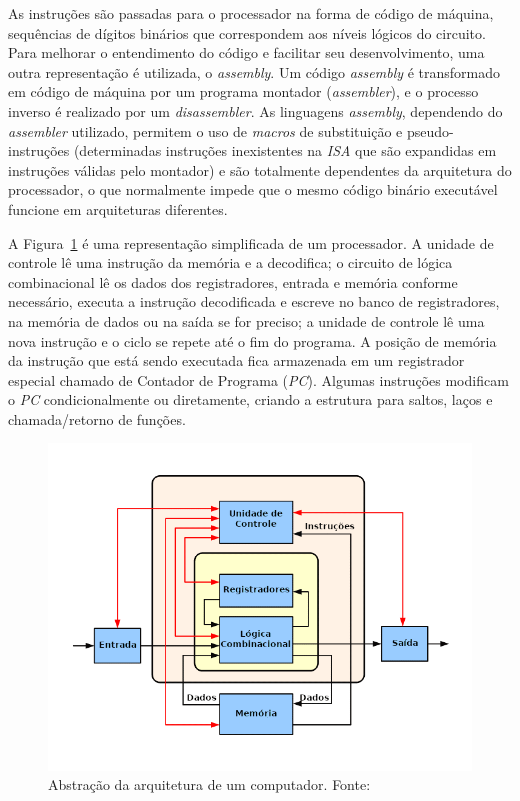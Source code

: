 { As instruções são passadas para o processador na forma de código de máquina,
    sequências de dígitos binários que correspondem aos níveis lógicos do
    circuito. Para melhorar o entendimento do código e facilitar seu
    desenvolvimento, uma outra representação é utilizada, o \textit{assembly}.
    Um código \textit{assembly} é transformado em código de máquina por um
    programa montador (\textit{assembler}), e o processo inverso é realizado
    por um \textit{disassembler}. As linguagens \textit{assembly}, dependendo do
    \textit{assembler} utilizado, permitem o uso de \textit{macros} de substituição
    e pseudo-instruções (determinadas instruções inexistentes na \textit{ISA}
    que são expandidas em instruções válidas pelo montador) e são totalmente
    dependentes da arquitetura do processador, o que normalmente impede que o
    mesmo código binário executável funcione em arquiteturas diferentes.
}

{ A Figura~\ref{fig:cpu_abstraction} é uma representação simplificada de um
    processador. A unidade de controle lê uma instrução da memória e a
    decodifica; o circuito de lógica combinacional lê os dados dos
    registradores, entrada e memória conforme necessário, executa a instrução
    decodificada e escreve no banco de registradores, na memória de dados ou
    na saída se for preciso; a unidade de controle lê uma nova instrução e o
    ciclo se repete até o fim do programa. A posição de memória da instrução
    que está sendo executada fica armazenada em um registrador especial chamado
    de Contador de Programa (\textit{PC}). Algumas instruções modificam o
    \textit{PC} condicionalmente ou diretamente, criando a estrutura para
    saltos, laços e chamada/retorno de funções.
}

\begin{figure}[H]
\centering
\includegraphics[width=.75\linewidth]
    {../images/ABasicComputer.png}
    \caption[Abstração da arquitetura de um computador]
    {Abstração da arquitetura de um
        computador. Fonte:~\cite{wikimedia2015basiccpu}}\label{fig:cpu_abstraction}
\end{figure}

